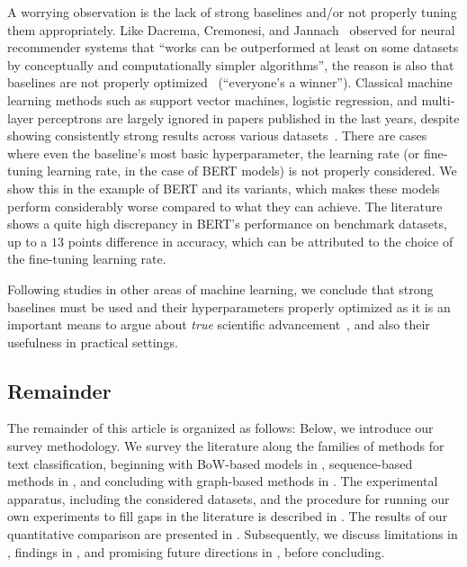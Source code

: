 A worrying observation is the lack of strong baselines and/or not properly tuning them appropriately.
Like Dacrema, Cremonesi, and Jannach~\cite{DBLP:conf/recsys/DacremaCJ19} observed for neural recommender systems that ``works can be outperformed at least on some datasets by conceptually and computationally simpler algorithms'', the reason is also that baselines are not properly optimized~\cite{DBLP:conf/recsys/ShehzadJ23} (``everyone's a winner'').
Classical machine learning methods such as support vector machines, logistic regression, and multi-layer perceptrons are largely ignored in papers published in the last years, despite showing consistently strong results across various datasets~\cite{galke2023really,galkescherp-acl2022,DBLP:conf/wsdm/RageshSIBL21}.
There are cases where even the baseline's most basic hyperparameter, the learning rate (or fine-tuning learning rate, in the case of BERT models) is not properly considered.
We show this in the example of BERT and its variants, which makes these models perform considerably worse compared to what they can achieve.
The literature shows a quite high discrepancy in BERT's performance on benchmark datasets, up to a $13$ points difference in accuracy, which can be attributed to the choice of the fine-tuning learning rate.

Following studies in other areas of machine learning, we conclude that strong baselines must be used and their hyperparameters properly optimized as it is an important means to argue about \textit{true} scientific advancement~\cite{DBLP:conf/acl/HenaoLCSSWWMZ18,DBLP:conf/recsys/DacremaCJ19}, and also their usefulness in practical settings.

\subsection{Remainder}

The remainder of this article is organized as follows: 
Below, we introduce our survey methodology.
We survey the literature along the families of methods for text classification, beginning with BoW-based models in , sequence-based methods in , and concluding with graph-based methods in .
The experimental apparatus, including the considered datasets, and the procedure for running our own experiments to fill gaps in the literature is described in .
The results of our quantitative comparison are presented in .
Subsequently, we discuss limitations in , findings in , and promising future directions in , before concluding.

